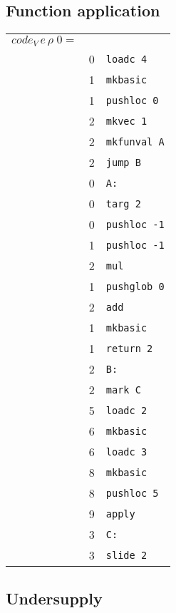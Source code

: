 \documentclass[10pt,a4paper]{article}
\begin{document}
	\subsection{Function application}
	
	\begin{tabular}{l l l}
		$code_V \, e \, \rho \; 0 = $ &  &\\
		& 0 & \texttt{loadc 4} \\
		& 1 & \texttt{mkbasic} \\
		& 1 & \texttt{pushloc 0} \\
		& 2 & \texttt{mkvec 1} \\
		& 2 & \texttt{mkfunval A} \\
		& 2 & \texttt{jump B} \\
		& 0 & \texttt{A:} \\
		& 0 & \texttt{targ 2} \\
		& 0 & \texttt{pushloc -1} \\
		& 1 & \texttt{pushloc -1} \\
		& 2 & \texttt{mul} \\
		& 1 & \texttt{pushglob 0} \\
		& 2 & \texttt{add} \\
		& 1 & \texttt{mkbasic} \\
		& 1 & \texttt{return 2} \\
		& 2 & \texttt{B:} \\
		& 2 & \texttt{mark C} \\
		& 5 & \texttt{loadc 2} \\
		& 6 & \texttt{mkbasic} \\
		& 6 & \texttt{loadc 3} \\
		& 8 & \texttt{mkbasic} \\
		& 8 & \texttt{pushloc 5} \\
		& 9 & \texttt{apply} \\
		& 3 & \texttt{C:} \\
		& 3 & \texttt{slide 2} \\
	\end{tabular}
	
	\subsection{Undersupply}
	
\end{document}
